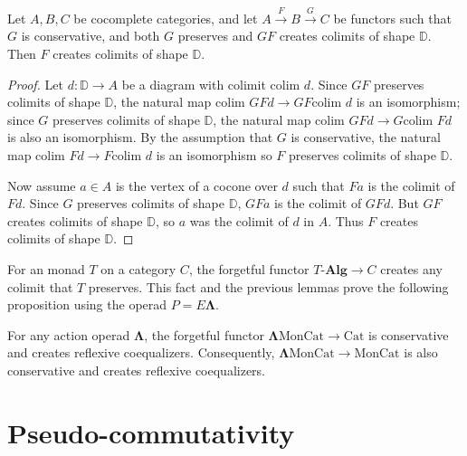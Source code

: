 \documentclass{amsbook} %
\newcommand{\mb}{\mathbf}
\newcommand{\colim}{\textrm{colim }}
\newcommand{\ML}{\mathbf{\Lambda}}
\newcommand{\moncat}{\ensuremath{\textrm{MonCat}}}
\newcommand{\cat}{\ensuremath{\textrm{Cat}}}
\newcommand{\Alg}{\mbox{-}\mb{Alg}}
\numberwithin{section}{chapter}
\begin{document}
\begin{lem}\label{creation_triangle}
Let $A,B,C$ be cocomplete categories, and let $A \stackrel{F}{\to} B \stackrel{G}{\to} C$ be functors such that $G$ is conservative, and both $G$ preserves and $GF$ creates colimits of shape $\mathbb{D}$. Then $F$ creates colimits of shape $\mathbb{D}$.
\end{lem}
\begin{proof}
Let $d:\mathbb{D} \to A$ be a diagram with colimit $\colim d$. Since $GF$ preserves colimits of shape $\mathbb{D}$, the natural map $\colim GFd \to GF \colim d$ is an isomorphism; since $G$ preserves colimits of shape $\mathbb{D}$, the natural map $\colim GFd \to G\colim Fd$ is also an isomorphism. By the assumption that $G$ is conservative, the natural map $\colim Fd \to F\colim d$ is an isomorphism so $F$ preserves colimits of shape $\mathbb{D}$.

Now assume $a \in A$ is the vertex of a cocone over $d$ such that $Fa$ is the colimit of $Fd$. Since $G$ preserves colimits of shape $\mathbb{D}$, $GFa$ is the colimit of $GFd$. But $GF$ creates colimits of shape $\mathbb{D}$, so $a$ was the colimit of $d$ in $A$. Thus $F$ creates colimits of shape $\mathbb{D}$.
\end{proof}

For an monad $T$ on a category $C$, the forgetful functor $T\Alg \to C$ creates any colimit that $T$ preserves. This fact and the previous lemmas prove the following proposition using the operad $P = E\ML$.
\begin{prop}\label{refcoeq_calcs}
For any action operad $\ML$, the forgetful functor $\ML\moncat \to \cat$ is conservative and creates reflexive coequalizers. Consequently, $\ML\moncat \to \moncat$ is also conservative and creates reflexive coequalizers.

\end{prop}







\section{Pseudo-commutativity}
\end{document}
